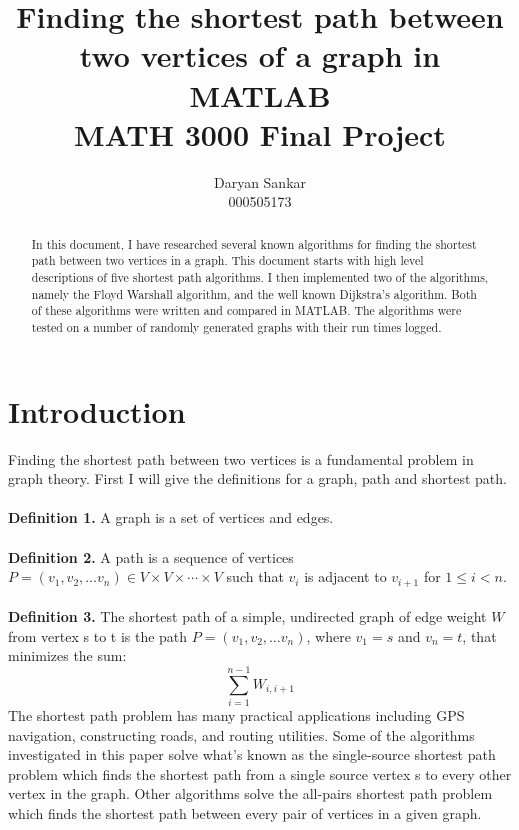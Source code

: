 \documentclass[]{article}
\title{Finding the shortest path between two vertices of a graph in MATLAB\\MATH 3000 Final Project}
\author {Daryan Sankar\\000505173}
\begin{document}
	
\maketitle

\begin{abstract}
	In this document, I have researched several known algorithms for finding the shortest path between two vertices in a graph. This document starts with high level descriptions of five shortest path algorithms. I then implemented two of the algorithms, namely the Floyd Warshall algorithm, and the well known Dijkstra's algorithm. Both of these algorithms were written and compared in MATLAB. The algorithms were tested on a number of randomly generated graphs with their run times logged.
\end{abstract}

\section{Introduction}
	Finding the shortest path between two vertices is a fundamental problem in graph theory.
	First I will give the definitions for a graph, path and shortest path.\\\\
	\textbf{Definition 1.} A graph is a set of vertices and edges.\\\\
	\textbf{Definition 2.} A path is a sequence of vertices $P = \left( v_{1}, v_{2}, \dots v_{n}\right) \in V \times V \times \cdots \times V $ such that $v_{i}$ is adjacent to $v_{i+1}$ for $1 \leq i < n$.\\\\
	\textbf{Definition 3.} The shortest path of a simple, undirected graph of edge weight $W$ from vertex s to t is the path $P = \left(v_{1}, v_{2}, \dots v_{n}\right)$, where $v_{1} = s$ and $v_{n} = t$, that minimizes the sum:
	\begin{equation}
	\sum_{i=1}^{n-1} W_{i,i+1}
	\end{equation}
	The shortest path problem has many practical applications including GPS navigation, constructing roads, and routing utilities.
	Some of the algorithms investigated in this paper solve what's known as the single-source shortest path problem which finds the shortest path from a single source vertex s to every other vertex in the graph. Other algorithms solve the all-pairs shortest path problem which finds the shortest path between every pair of vertices in a given graph.\\\\
\end{document}
